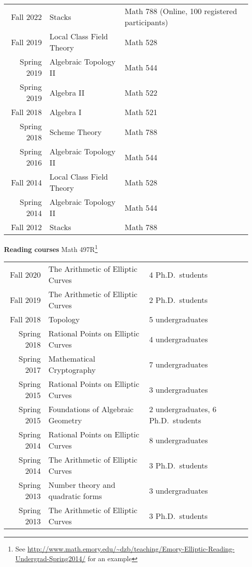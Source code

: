 \documentclass[margin,line]{res}
\newcommand{\defi}[1]{\textsf{#1}} 				%
\begin{document}
\begin{resume}
\begin{tabular}{rll}  
  Fall 2022 & \defi{Stacks} & Math 788 (Online, 100 registered participants)\\
  Fall 2019 & \defi{Local Class Field Theory}  & Math 528\\
Spring 2019&  \defi{Algebraic Topology II}  & Math 544\\
Spring 2019&  \defi{Algebra  II}  & Math 522\\
Fall 2018&  \defi{Algebra  I}  & Math 521\\
Spring 2018&  \defi{Scheme Theory}  & Math 788\\
Spring 2016&  \defi{Algebraic Topology II}  & Math 544\\
Fall 2014&  \defi{Local Class Field Theory}  & Math 528\\
Spring 2014&  \defi{Algebraic Topology II}  & Math 544\\
Fall 2012&  \defi{Stacks}  & Math 788\\
\end{tabular}

{\bf Reading courses} Math 497R\footnote{See \url{http://www.math.emory.edu/~dzb/teaching/Emory-Elliptic-Reading-Undergrad-Spring2014/} for an example}
\vspace*{-.1in}

\begin{tabular}{rll}  
Fall 2020 &\defi{The Arithmetic of Elliptic Curves}  & 4 Ph.D.~students            \\
Fall 2019 &\defi{The Arithmetic of Elliptic Curves}  & 2 Ph.D.~students            \\  
Fall 2018 &\defi{Topology}   & 5 undergraduates\\
Spring 2018 &\defi{Rational Points on Elliptic Curves}  & 4 undergraduates\\
Spring 2017 &\defi{Mathematical Cryptography}   & 7 undergraduates        \\
Spring 2015 &\defi{Rational Points on Elliptic Curves}  & 3 undergraduates\\
Spring 2015 &\defi{Foundations of Algebraic Geometry}  & 2 undergraduates, 6 Ph.D.~students    \\
Spring 2014 &\defi{Rational Points on Elliptic Curves}  & 8 undergraduates\\
Spring 2014 &\defi{The Arithmetic of Elliptic Curves}  & 3 Ph.D.~students                \\
Spring 2013 &\defi{Number theory and quadratic forms}  & 3 undergraduates\\
Spring 2013 &\defi{The Arithmetic of Elliptic Curves}  & 3 Ph.D.~students            \\
\end{tabular}


\end{resume}
\end{document}
